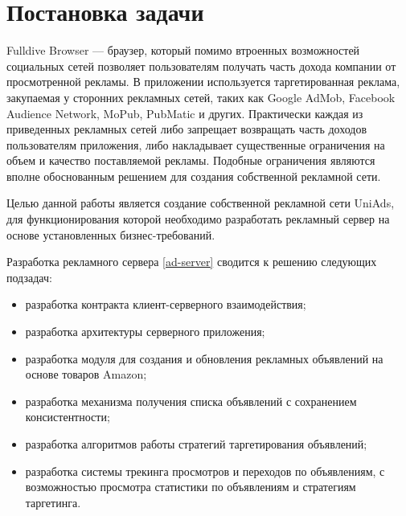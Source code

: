 \documentclass[times]{itmo-student-thesis}
\begin{document}










\section{Постановка задачи}

Fulldive Browser — браузер, который помимо втроенных возможностей социальных сетей позволяет пользователям получать часть дохода компании от просмотренной рекламы. В приложении используется таргетированная реклама, закупаемая у сторонних рекламных сетей, таких как Google AdMob, Facebook Audience Network, MoPub, PubMatic и других. Практически каждая из приведенных рекламных сетей либо запрещает возвращать часть доходов пользователям приложения, либо накладывает существенные ограничения на объем и качество поставляемой рекламы. Подобные ограничения являются вполне обоснованным решением для создания собственной рекламной сети.

Целью данной работы является создание собственной рекламной сети UniAds, для функционирования которой необходимо разработать рекламный сервер на основе установленных бизнес-требований.

Разработка рекламного сервера \ref{ad-server} сводится к решению следующих подзадач:
\begin{itemize}
\item разработка контракта клиент-серверного взаимодействия;
\item разработка архитектуры серверного приложения;
\item разработка модуля для создания и обновления рекламных объявлений на основе товаров Amazon;
\item разработка механизма получения списка объявлений с сохранением консистентности;
\item разработка алгоритмов работы стратегий таргетирования объявлений;
\item разработка системы трекинга просмотров и переходов по объявлениям, с возможностью просмотра статистики по объявлениям и стратегиям таргетинга.
\end{itemize}
\end{document}
